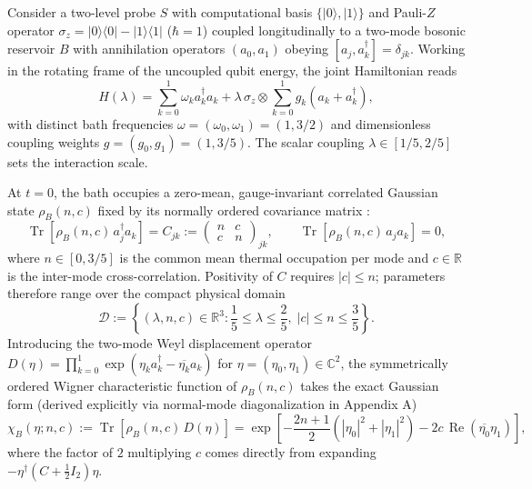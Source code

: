 \documentclass[11pt,letterpaper]{article}
\theoremstyle{definition}
\begin{document}
Consider a two-level probe \(S\) with computational basis
\(\{|0\rangle, |1\rangle\}\) and Pauli-\(Z\) operator
\(\sigma_z = |0\rangle\langle 0| - |1\rangle\langle 1|\) (\(\hbar = 1\))
coupled longitudinally to a two-mode bosonic reservoir \(B\) with
annihilation operators \((a_0, a_1)\) obeying
\([a_j, a_k^\dagger] = \delta_{jk}\). Working in the rotating frame of
the uncoupled qubit energy, the joint Hamiltonian reads
\[H(\lambda) = \sum_{k=0}^{1} \omega_k a_k^\dagger a_k + \lambda\,\sigma_z \otimes \sum_{k=0}^{1} g_k \left(a_k + a_k^\dagger\right),
\tag{1}\] with distinct bath frequencies
\(\omega = (\omega_0, \omega_1) = (1, 3/2)\) and dimensionless coupling
weights \(g = (g_0, g_1) = (1, 3/5)\). The scalar coupling
\(\lambda \in [1/5, 2/5]\) sets the interaction scale.

At \(t = 0\), the bath occupies a zero-mean, gauge-invariant correlated
Gaussian state \(\rho_B(n, c)\) fixed by its normally ordered covariance
matrix \citep{weedbrook2012, serafini2017}:
\[\operatorname{Tr}\!\left[\rho_B(n, c)\, a_j^\dagger a_k\right] = C_{jk} := \begin{pmatrix} n & c \\ c & n \end{pmatrix}_{jk}, \qquad \operatorname{Tr}\!\left[\rho_B(n, c)\, a_j a_k\right] = 0,
\tag{2}\] where \(n \in [0, 3/5]\) is the common mean thermal occupation
per mode and \(c \in \mathbb{R}\) is the inter-mode cross-correlation.
Positivity of \(C\) requires \(|c| \le n\); parameters therefore range
over the compact physical domain
\[\mathcal{D} := \left\{(\lambda, n, c) \in \mathbb{R}^3 : \frac{1}{5} \le \lambda \le \frac{2}{5},\; |c| \le n \le \frac{3}{5}\right\}.
\tag{3}\] Introducing the two-mode Weyl displacement operator
\(D(\eta) = \prod_{k=0}^1 \exp(\eta_k a_k^\dagger - \overline{\eta_k} a_k)\)
for \(\eta = (\eta_0, \eta_1) \in \mathbb{C}^2\), the symmetrically
ordered Wigner characteristic function \citep{wigner1932, serafini2017}
of \(\rho_B(n, c)\) takes the exact Gaussian form (derived explicitly
via normal-mode diagonalization in Appendix A)
\[\chi_B(\eta; n, c) := \operatorname{Tr}\!\left[\rho_B(n, c)\, D(\eta)\right] = \exp\!\left[-\frac{2n+1}{2}\left(|\eta_0|^2 + |\eta_1|^2\right) - 2c\,\operatorname{Re}\!\left(\overline{\eta_0}\eta_1\right)\right],
\tag{4}\] where the factor of \(2\) multiplying \(c\) comes directly
from expanding \(-\eta^\dagger(C + \frac{1}{2}I_2)\eta\).
\end{document}
